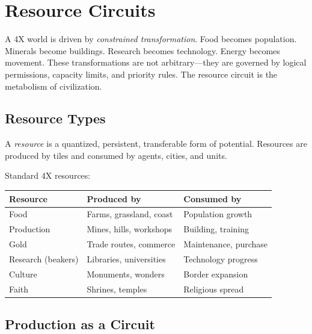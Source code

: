 \documentclass[11pt,a4paper,openany]{book}
\theoremstyle{plain}
\theoremstyle{definition}
\theoremstyle{remark}
\newenvironment{background}{%
  \begin{mdframed}[
    linecolor=sphereblue!40, backgroundcolor=sphereblue!5,
    linewidth=1pt, innertopmargin=8pt, innerbottommargin=8pt,
    innerleftmargin=10pt, innerrightmargin=10pt,
    skipabove=10pt, skipbelow=6pt
  ]%
  \setlength{\parindent}{0pt}%
  \noindent{\textcolor{sphereblue}{\textbf{Background}}}\par\smallskip\ignorespaces
}{\end{mdframed}}
\newenvironment{defbox}[1]{%
  \begin{tcolorbox}[
    title={\textbf{Definition:} #1},
    colback=defbg,
    colframe=sphereamber!80,
    fonttitle=\bfseries,
    coltitle=sphereamber!60!black,
    sharp corners,
    breakable,
    before upper={\normalfont\setlength{\parindent}{0pt}\tolerance=9999\hbadness=9999}
  ]
}{\end{tcolorbox}}
\begin{document}
\chapter{Resource Circuits}
\label{ch:resources}

\begin{background}
  A 4X world is driven by \emph{constrained transformation}. Food becomes
  population. Minerals become buildings. Research becomes technology. Energy
  becomes movement. These transformations are not arbitrary---they are
  governed by logical permissions, capacity limits, and priority rules.
  The resource circuit is the metabolism of civilization.
\end{background}

\section{Resource Types}

\begin{defbox}{Resource}
  A \emph{resource} is a quantized, persistent, transferable form of
  potential. Resources are produced by tiles and consumed by agents,
  cities, and units.
\end{defbox}

Standard 4X resources:

\begin{center}
\begin{tabular}{lll}
  \toprule
  \textbf{Resource} & \textbf{Produced by}       & \textbf{Consumed by} \\
  \midrule
  Food              & Farms, grassland, coast     & Population growth \\
  Production        & Mines, hills, workshops     & Building, training \\
  Gold              & Trade routes, commerce      & Maintenance, purchase \\
  Research (beakers)& Libraries, universities     & Technology progress \\
  Culture           & Monuments, wonders          & Border expansion \\
  Faith             & Shrines, temples            & Religious spread \\
  \bottomrule
\end{tabular}
\end{center}

\section{Production as a Circuit}
\end{document}

